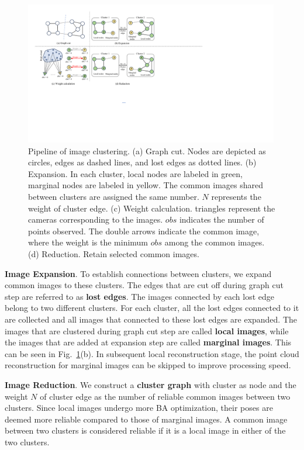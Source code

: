 \documentclass[runningheads]{llncs}
\begin{document}
\begin{figure}[t]
    \centering
        \includegraphics[width=0.99\textwidth]{figs/cluster_pipe.pdf}
        \caption{Pipeline of image clustering. (a) Graph cut. Nodes are depicted as circles, edges as dashed lines, and lost edges as dotted lines. (b) Expansion. In each cluster, local nodes are labeled in green, marginal nodes are labeled in yellow. The common images shared between clusters are assigned the same number. $N$ represents the weight of cluster edge. (c) Weight calculation. triangles represent the cameras corresponding to the images. $obs$ indicates the number of points observed. The double arrows indicate the common image, where the weight is the minimum $obs$ among the common images. (d) Reduction. Retain selected common images.}
    \label{fig_image_clustering}
    \vspace{-0.5em}
\end{figure}

\textbf{Image Expansion}. To establish connections between clusters, we expand common images to these clusters. The edges that are cut off during graph cut step are referred to as \textbf{lost edges}. The images connected by each lost edge belong to two different clusters. For each cluster, all the lost edges connected to it are collected and all images that connected to these lost edges are expanded. The images that are clustered during graph cut step are called \textbf{local images}, while the images that are added at expansion step are called \textbf{marginal images}. This can be seen in Fig.~\ref{fig_image_clustering}(b). In subsequent local reconstruction stage, the point cloud reconstruction for marginal images can be skipped to improve processing speed.

\textbf{Image Reduction}. We construct a \textbf{cluster graph} with cluster as node and the weight $N$ of cluster edge as the number of reliable common images between two clusters. Since local images undergo more BA optimization, their poses are deemed more reliable compared to those of marginal images. A common image between two clusters is considered reliable if it is a local image in either of the two clusters.
\end{document}
